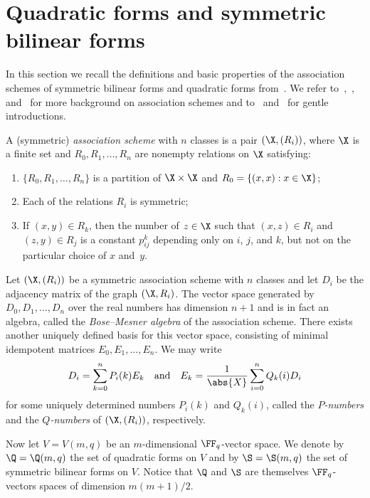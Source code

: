 %

\section{Quadratic forms and symmetric bilinear forms}

In this section we recall the definitions and basic properties of the association schemes of symmetric bilinear forms and quadratic forms from~\cite{WanWanMaMa2003}. We refer to~\cite{Del1973},~\cite{DelLev1998}, and~\cite{BanIto1984} for more background on association schemes and to~\cite[Chapter~21]{MacSlo1977} and~\cite[Chapter~30]{vLiWil2001} for gentle introductions.
\par
A (symmetric) \emph{association scheme} with $n$ classes is a pair $(\X,(R_i))$, where $\X$ is a finite set and $R_0,R_1,\dots,R_n$ are nonempty relations on $\X$ satisfying:
\begin{enumerate}
\item %
$\{R_0,R_1,\dots,R_n\}$ is a partition of $\X\times\X$ and $R_0=\{(x,x):x\in \X\}$;
\item %
Each of the relations $R_i$ is symmetric;
\item %
If $(x,y)\in R_k$, then the number of $z\in \X$ such that $(x,z)\in R_i$ and $(z,y)\in R_j$ is a constant $p^k_{ij}$ depending only on $i$, $j$, and $k$, but not on the particular choice of $x$ and~$y$.
\end{enumerate}
\par
Let $(\X,(R_i))$ be a symmetric association scheme with $n$ classes and let $D_i$ be the adjacency matrix of the graph $(\X,R_i)$. The vector space generated by $D_0,D_1,\dots,D_n$ over the real numbers has dimension $n+1$ and is in fact an algebra, called the \emph{Bose--Mesner algebra} of the association scheme. There exists another uniquely defined basis for this vector space, consisting of minimal idempotent matrices $E_0,E_1,\dots,E_n$. We may write
\[
D_i=\sum_{k=0}^nP_i(k)E_k\quad\text{and}\quad E_k=\frac{1}{\abs{X}}\sum_{i=0}^nQ_k(i)D_i
\]
for some uniquely determined numbers $P_i(k)$ and $Q_k(i)$, called the \emph{$P$-numbers} and the \emph{$Q$-numbers} of $(\X,(R_i))$, respectively.
\par
Now let $V=V(m,q)$ be an $m$-dimensional $\FF_q$-vector space. We denote by 
$\Q=\Q(m,q)$ the set of quadratic forms on $V$ and by $\S=\S(m,q)$ the set of symmetric bilinear forms on $V$. Notice that $\Q$ and $\S$ are themselves $\FF_q$-vectors spaces of dimension $m(m+1)/2$.
\par

